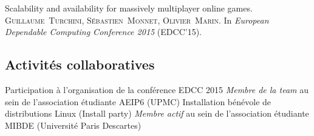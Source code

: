\documentclass[11pt,a4paper,sans]{moderncv}
\begin{document}
       {
            Scalability and availability for massively multiplayer online games.\endgraf
            \textsc{Guillaume~Turchini, Sébastien~Monnet, Olivier~Marin}.\endgraf
            In \textit{European Dependable Computing Conference 2015} (EDCC'15).
       }
       
\vspace{0.5em}

\subsection{Activités collaboratives}
\vspace{1em}

       {Participation à l'organisation de la conférence EDCC 2015}
       {\textit{Membre de la team} au sein de l'association étudiante AEIP6 (UPMC)}
       {Installation bénévole de distributions Linux (Install party)}
       {\textit{Membre actif} au sein de l'association étudiante MIBDE (Université Paris Descartes)}
\end{document}
